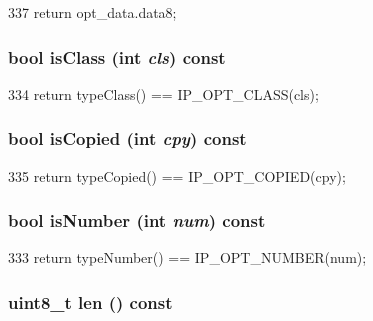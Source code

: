 \begin{DoxyCode}
337 { return opt_data.data8; }
\end{DoxyCode}
\hypertarget{structNet_1_1IpOpt_af8db3392ce09aa2444a45b96329091b3}{
\subsubsection[{isClass}]{\setlength{\rightskip}{0pt plus 5cm}bool isClass (int {\em cls}) const}}
\label{structNet_1_1IpOpt_af8db3392ce09aa2444a45b96329091b3}



\begin{DoxyCode}
334 { return typeClass() == IP_OPT_CLASS(cls); }
\end{DoxyCode}
\hypertarget{structNet_1_1IpOpt_ae46fa46d3ed974922da4d9114fa327cc}{
\subsubsection[{isCopied}]{\setlength{\rightskip}{0pt plus 5cm}bool isCopied (int {\em cpy}) const}}
\label{structNet_1_1IpOpt_ae46fa46d3ed974922da4d9114fa327cc}



\begin{DoxyCode}
335 { return typeCopied() == IP_OPT_COPIED(cpy); }
\end{DoxyCode}
\hypertarget{structNet_1_1IpOpt_a91618c1cf25e9f87b1603e51b2a89607}{
\subsubsection[{isNumber}]{\setlength{\rightskip}{0pt plus 5cm}bool isNumber (int {\em num}) const}}
\label{structNet_1_1IpOpt_a91618c1cf25e9f87b1603e51b2a89607}



\begin{DoxyCode}
333 { return typeNumber() == IP_OPT_NUMBER(num); }
\end{DoxyCode}
\hypertarget{structNet_1_1IpOpt_a157a538f6c0e591c974744259b42d8f3}{
\subsubsection[{len}]{\setlength{\rightskip}{0pt plus 5cm}uint8\_\-t len () const}}
\label{structNet_1_1IpOpt_a157a538f6c0e591c974744259b42d8f3}



